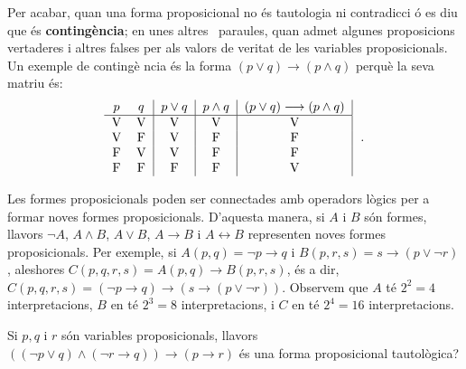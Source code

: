 Per acabar, quan una forma proposicional no \'{e}s tautologia ni contradicci%
\'{o} es diu que \'{e}s \textbf{conting\`{e}ncia}; en unes altres \
paraules, quan admet algunes proposicions vertaderes i altres falses per als
valors de veritat de les variables proposicionals. Un exemple de conting\`{e}%
ncia \'{e}s la forma $(p\vee q)\longrightarrow(p\wedge q)$ perqu\`{e} la
seva matriu \'{e}s:%
\begin{equation*}
\begin{tabular}{cc|c|c|c|}
$p$ & $q$ & $p\vee q$ & $p\wedge q$ & $(p\vee q)\longrightarrow(p\wedge q)$
\\ \hline
V & V & V & V & V \\
V & F & V & F & F \\
F & V & V & F & F \\
F & F & F & F & V%
\end{tabular}
\text{.}
\end{equation*}

\bigskip

Les formes proposicionals poden ser connectades amb operadors l\`{o}gics per
a formar noves formes proposicionals. D'aquesta manera, si $A$ i $B$ s\'{o}n
formes, llavors $\lnot A$, $A\wedge B$, $A\vee B$, $A\longrightarrow B$ i $%
A\longleftrightarrow B$ representen noves formes proposicionals. Per
exemple, si $A(p,q)=\lnot p\longrightarrow q$ i $B(p,r,s)=s\longrightarrow%
\left( p\vee\lnot r\right) $, aleshores $C(p,q,r,s)=A(p,q)\longrightarrow
B(p,r,s)$, \'{e}s a dir, $C(p,q,r,s)=\left( \lnot p\longrightarrow q\right)
\longrightarrow\left( s\longrightarrow\left( p\vee\lnot r\right) \right) $.
Observem que $A$ t\'{e} $2^{2}=4$ interpretacions, $B$ en t\'{e} $2^{3}=8$
interpretacions, i $C$ en t\'{e} $2^{4}=16$ interpretacions.

\begin{exem}
Si $p,q$ i $r$ s\'{o}n variables proposicionals, llavors $\left( \left(
\lnot p\vee q\right) \wedge\left( \lnot r\longrightarrow q\right) \right)
\longrightarrow\left( p\longrightarrow r\right) $ \'{e}s una forma
proposicional tautol\`{o}gica?
\end{exem}

